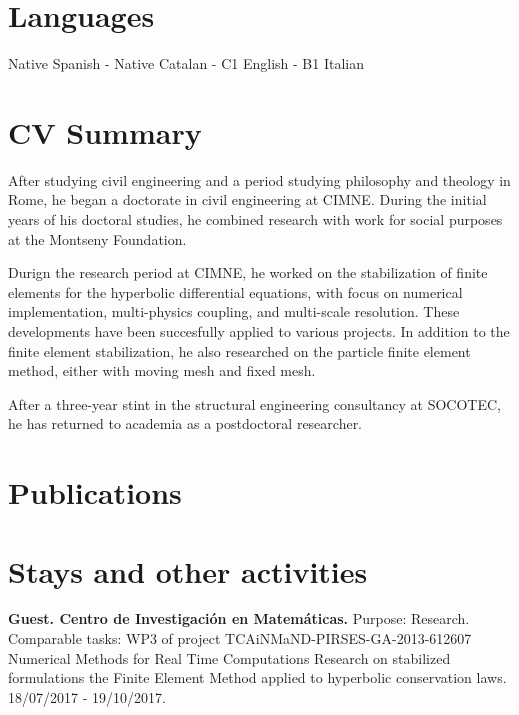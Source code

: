 \documentclass[12pt]{article}
\begin{document}
\section{Languages}
Native Spanish - Native Catalan - C1 English - B1 Italian


\section{CV Summary}
After studying civil engineering and a period studying philosophy and theology in Rome, he began
a doctorate in civil engineering at CIMNE. During the initial years of his doctoral studies, he combined
research with work for social purposes at the Montseny Foundation.

Durign the research period at CIMNE, he worked on the stabilization of finite elements for the hyperbolic
differential equations, with focus on numerical implementation, multi-physics coupling, and multi-scale
resolution. These developments have been succesfully applied to various projects. In addition to
the finite element stabilization, he also researched on the particle finite element method, either
with moving mesh and fixed mesh.

After a three-year stint in the structural engineering consultancy at SOCOTEC, he has returned to academia as a postdoctoral researcher.


\section{Publications}
\nocite{*}
\printbibliography[heading={subbibliography}, title={Journal papers}, type=article]
\printbibliography[heading={subbibliography}, title={Theses}, type=thesis]
\printbibliography[heading={subbibliography}, title={Conferences}, type=inproceedings]


\section{Stays and other activities}
\textbf{Guest. Centro de Investigación en Matemáticas.} Purpose: Research. Comparable tasks: WP3 of project
TCAiNMaND-PIRSES-GA-2013-612607 Numerical Methods for Real Time Computations Research on stabilized
formulations the Finite Element Method applied to hyperbolic conservation laws. 18/07/2017 - 19/10/2017.
\end{document}
